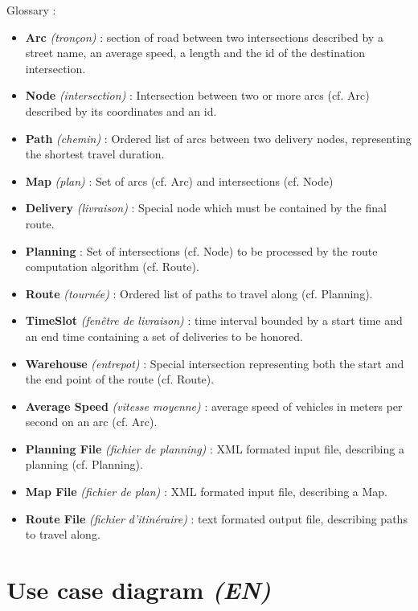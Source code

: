\documentclass[paper=a4, fontsize=11pt]{report}
\numberwithin{equation}{section}		%
\numberwithin{figure}{section}		%
\numberwithin{table}{section}		%
\renewcommand{\bf}[1]{\textbf{#1}}
\renewcommand{\it}[1]{\textit{#1}}
\begin{document}
Glossary : 
\begin{itemize}
	\item[\textbullet] \bf{Arc} \it{(tronçon)} : section of road between two intersections described by a street name, an average speed, a length and the id of the destination intersection.
	\item[\textbullet] \bf{Node} \it{(intersection)} : Intersection between two or more arcs (cf. Arc) described by its coordinates and an id.
	\item[\textbullet] \bf{Path} \it{(chemin)} : Ordered list of arcs between two delivery nodes, representing the shortest travel duration.
	\item[\textbullet] \bf{Map} \it{(plan)} : Set of arcs (cf. Arc) and intersections (cf. Node)
	\item[\textbullet] \bf{Delivery} \it{(livraison)} : Special node which must be contained by the final route.
	\item[\textbullet] \bf{Planning} : Set of intersections (cf. Node) to be processed by the route computation algorithm (cf. Route).
	\item[\textbullet] \bf{Route} \it{(tournée)} : Ordered list of paths to travel along (cf. Planning). 
	\item[\textbullet] \bf{TimeSlot} \it{(fenêtre de livraison)} : time interval bounded by a start time and an end time containing a set of deliveries to be honored.
	\item[\textbullet] \bf{Warehouse} \it{(entrepot)} : Special intersection representing both the start and the end point of the route (cf. Route).
	\item[\textbullet] \bf{Average Speed} \it{(vitesse moyenne)} : average speed of vehicles in meters per second on an arc (cf. Arc).
	\item[\textbullet] \bf{Planning File} \it{(fichier de planning)} : XML formated input file, describing a planning (cf. Planning).
	\item[\textbullet] \bf{Map File} \it{(fichier de plan)} : XML formated input file, describing a Map.
	\item[\textbullet] \bf{Route File} \it{(fichier d’itinéraire)} : text formated output file, describing paths to travel along.
\end{itemize}

\section{Use case diagram \it{(EN)}}
\label{sec:use-case-diagram}
\end{document}
